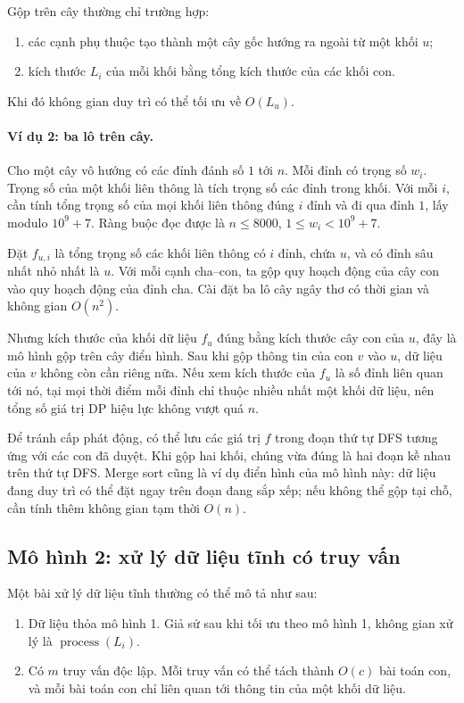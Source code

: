 \documentclass[11pt]{article}
\begin{document}
Gộp trên cây thường chỉ trường hợp:
\begin{enumerate}
  \item các cạnh phụ thuộc tạo thành một cây gốc hướng ra ngoài từ một khối
  $u$;
  \item kích thước $L_i$ của mỗi khối bằng tổng kích thước của các khối con.
\end{enumerate}
Khi đó không gian duy trì có thể tối ưu về $O(L_u)$.

\paragraph{Ví dụ 2: ba lô trên cây.}
Cho một cây vô hướng có các đỉnh đánh số $1$ tới $n$. Mỗi đỉnh có trọng số
$w_i$. Trọng số của một khối liên thông là tích trọng số các đỉnh trong khối.
Với mỗi $i$, cần tính tổng trọng số của mọi khối liên thông đúng $i$ đỉnh và
đi qua đỉnh $1$, lấy modulo $10^9+7$. Ràng buộc đọc được là
$n\le 8000$, $1\le w_i<10^9+7$.

Đặt $f_{u,i}$ là tổng trọng số các khối liên thông có $i$ đỉnh, chứa $u$, và
có đỉnh sâu nhất nhỏ nhất là $u$. Với mỗi cạnh cha--con, ta gộp quy hoạch động
của cây con vào quy hoạch động của đỉnh cha. Cài đặt ba lô cây ngây thơ có
thời gian và không gian $O(n^2)$.

Nhưng kích thước của khối dữ liệu $f_u$ đúng bằng kích thước cây con của $u$,
đây là mô hình gộp trên cây điển hình. Sau khi gộp thông tin của con $v$ vào
$u$, dữ liệu của $v$ không còn cần riêng nữa. Nếu xem kích thước của $f_u$ là
số đỉnh liên quan tới nó, tại mọi thời điểm mỗi đỉnh chỉ thuộc nhiều nhất một
khối dữ liệu, nên tổng số giá trị DP hiệu lực không vượt quá $n$.

Để tránh cấp phát động, có thể lưu các giá trị $f$ trong đoạn thứ tự DFS tương
ứng với các con đã duyệt. Khi gộp hai khối, chúng vừa đúng là hai đoạn kề nhau
trên thứ tự DFS. Merge sort cũng là ví dụ điển hình của mô hình này: dữ liệu
đang duy trì có thể đặt ngay trên đoạn đang sắp xếp; nếu không thể gộp tại chỗ,
cần tính thêm không gian tạm thời $O(n)$.

\subsection{Mô hình 2: xử lý dữ liệu tĩnh có truy vấn}

Một bài xử lý dữ liệu tĩnh thường có thể mô tả như sau:
\begin{enumerate}
  \item Dữ liệu thỏa mô hình 1. Giả sử sau khi tối ưu theo mô hình 1, không
  gian xử lý là $\operatorname{process}(L_i)$.
  \item Có $m$ truy vấn độc lập. Mỗi truy vấn có thể tách thành $O(c)$ bài toán
  con, và mỗi bài toán con chỉ liên quan tới thông tin của một khối dữ liệu.
\end{enumerate}
\end{document}
